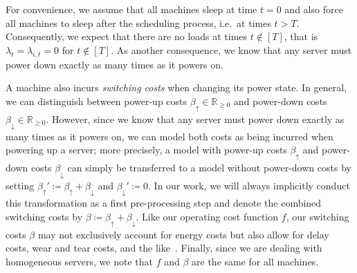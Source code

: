 For convenience, we assume that all machines sleep at time $t=0$ and also force all machines to sleep after the scheduling process, i.e.\ at times $t>T$. Consequently, we expect that there are no loads at times $t\notin[T]$, that is $\lambda_t=\lambda_{i,t}=0$ for $t\notin[T]$. As another consequence, we know that any server must power down exactly as many times as it powers on.

A machine also incurs \emph{switching costs} when changing its power state. In general, we can distinguish between power-up costs $\beta_\uparrow\in\mathbb{R}_{\ge 0}$ and power-down costs $\beta_\downarrow\in\mathbb{R}_{\ge 0}$. However, since we know that any server must power down exactly as many times as it powers on, we can model both costs as being incurred when powering up a server; more precisely, a model with power-up costs $\beta_\uparrow$ and power-down costs $\beta_\downarrow$ can simply be transferred to a model without power-down costs by setting $\beta_\uparrow'\coloneqq\beta_\uparrow+\beta_\downarrow$ and $\beta_\downarrow'\coloneqq0$. In our work, we will always implicitly conduct this transformation as a first pre-processing step and denote the combined switching costs by $\beta\coloneqq\beta_\uparrow+\beta_\downarrow$. Like our operating cost function $f$, our switching costs $\beta$ may not exclusively account for energy costs but also allow for delay costs, wear and tear costs, and the like~\parencite{dyn-right-sizing}. Finally, since we are dealing with homogeneous servers, we note that $f$ and $\beta$ are the same for all machines.

